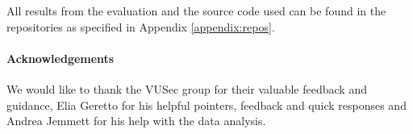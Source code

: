 All results from the evaluation and the source code used can be found in the repositories as specified in Appendix \ref{appendix:repos}.

\paragraph*{Acknowledgements}
We would like to thank the VUSec group for their valuable feedback and guidance, Elia Geretto for his helpful pointers, feedback and quick responses and Andrea Jemmett for his help with the data analysis.

